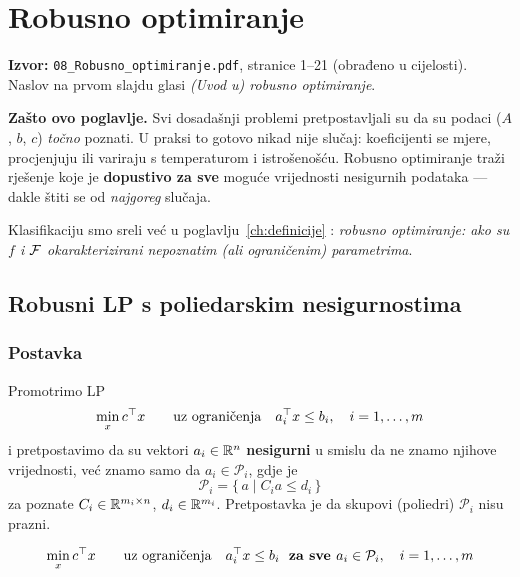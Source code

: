 \chapter{Robusno optimiranje}
\label{ch:robusno}

\begin{izvor}
\textbf{Izvor:} \texttt{08\_Robusno\_optimiranje.pdf}, stranice 1--21
(obrađeno u cijelosti). Naslov na prvom slajdu glasi \emph{(Uvod u) robusno
optimiranje}.
\end{izvor}

\textbf{Zašto ovo poglavlje.} Svi dosadašnji problemi pretpostavljali su da su
podaci ($A$, $b$, $c$) \emph{točno} poznati. U praksi to gotovo nikad nije
slučaj: koeficijenti se mjere, procjenjuju ili variraju s temperaturom i
istrošenošću. Robusno optimiranje traži rješenje koje je \textbf{dopustivo za
sve} moguće vrijednosti nesigurnih podataka --- dakle štiti se od
\emph{najgoreg} slučaja.

Klasifikaciju smo sreli već u poglavlju~\ref{ch:definicije} :
\emph{robusno optimiranje: ako su $f$ i $\Feas$ okarakterizirani nepoznatim
(ali ograničenim) parametrima}.

\section{Robusni LP s poliedarskim nesigurnostima}
\label{sec:poliedarske}

\subsection{Postavka}

Promotrimo LP
\[
\min_x c\T x \qquad \uzogr a_i\T x \le b_i, \quad i = 1,\dots,m
\]
i pretpostavimo da su vektori $a_i \in \R^n$ \textbf{nesigurni} u smislu da ne
znamo njihove vrijednosti, već znamo samo da $a_i \in \mathcal{P}_i$, gdje je
\[
\mathcal{P}_i = \{\, a \mid C_ia \le d_i \,\}
\]
za poznate $C_i \in \R^{m_i\times n}$, $d_i \in \R^{m_i}$. Pretpostavka je da
skupovi (poliedri) $\mathcal{P}_i$ nisu prazni.

\begin{definicija}[Robusni LP]
\begin{equation}
\label{eq:robusni-lp-poliedar}
\min_x c\T x \qquad \uzogr
a_i\T x \le b_i \;\textbf{ za sve } a_i \in \mathcal{P}_i, \quad i = 1,\dots,m
\end{equation}
\end{definicija}

